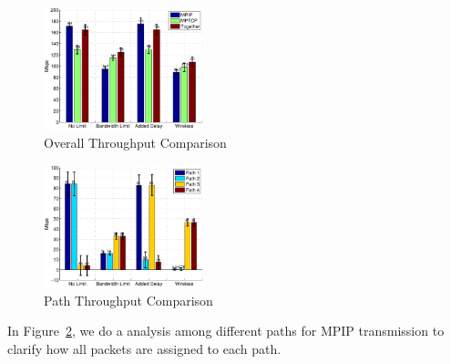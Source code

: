 \begin{figure}
\centering
\includegraphics[width=0.8\linewidth,height=1.4in]{fig/tp_bar.eps}
\caption{Overall Throughput Comparison}
\label{fig.tp_bar}
\end{figure}

\begin{figure}
\centering
\includegraphics[width=0.8\linewidth,height=1.4in]{fig/path_tp_bar.eps}
\caption{Path Throughput Comparison}
\label{fig.path_tp_bar}
\end{figure}




In Figure~\ref{fig.path_tp_bar}, we do a analysis among different paths for MPIP transmission to clarify how all packets are assigned to each path. 

